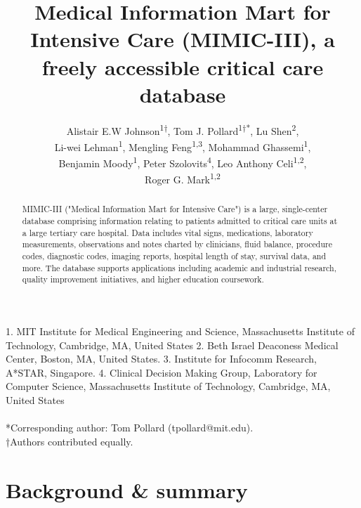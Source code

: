 \documentclass[english]{article}
\begin{document}
\title{Medical Information Mart for Intensive Care (MIMIC-III), a freely accessible critical care database}


\author{
Alistair E.W Johnson\textsuperscript{1{†}},
Tom J. Pollard\textsuperscript{1{†}{*}},
Lu Shen\textsuperscript{2}, \\
Li-wei Lehman\textsuperscript{1},
Mengling Feng\textsuperscript{1,3},
Mohammad Ghassemi\textsuperscript{1}, \\
Benjamin Moody\textsuperscript{1},
Peter Szolovits\textsuperscript{4},
Leo Anthony Celi\textsuperscript{1,2}, \\
Roger G. Mark\textsuperscript{1,2}
}

\maketitle
\thispagestyle{fancy}

1. MIT Institute for Medical Engineering and Science, Massachusetts Institute of Technology, Cambridge, MA, United States 2. Beth Israel Deaconess Medical Center, Boston, MA, United States. 3. Institute for Infocomm Research, A*STAR, Singapore. 4. Clinical Decision Making Group, Laboratory for Computer Science, Massachusetts Institute of Technology, Cambridge, MA, United States \\ 
\\
{*}Corresponding author: Tom Pollard (tpollard@mit.edu). \\
{†}Authors contributed equally.

\begin{abstract} %
MIMIC-III ("Medical Information Mart for Intensive Care") is a large, single-center database comprising information relating to patients admitted to critical care units at a large tertiary care hospital. Data includes vital signs, medications, laboratory measurements, observations and notes charted by clinicians, fluid balance, procedure codes, diagnostic codes, imaging reports, hospital length of stay, survival data, and more. The database supports applications including academic and industrial research, quality improvement initiatives, and higher education coursework.
\end{abstract}

\section*{Background \& summary} %
\end{document}
